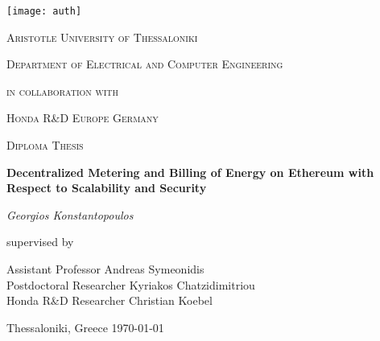 \begin{titlepage}
	\centering
	\texttt{[image: auth]}\par\vspace{1cm}
	{\scshape\LARGE Aristotle University of Thessaloniki \par}
	{\scshape\Large Department of Electrical and Computer Engineering\par}
	\vspace{1cm}
	{\scshape\Large in collaboration with \par}
	{\scshape\LARGE Honda R\&D Europe Germany \par}
	\vspace{1cm}
	{\scshape\Large Diploma Thesis\par}
	\vspace{1.5cm}
    {\huge\bfseries Decentralized Metering and Billing of Energy on Ethereum with Respect to Scalability and Security \par}
	\vspace{2cm}
	{\Large\itshape Georgios Konstantopoulos\par}
	\vfill
	supervised by\par
	Assistant Professor Andreas Symeonidis\\
	Postdoctoral Researcher Kyriakos Chatzidimitriou\\
	Honda R\&D Researcher Christian Koebel 

	\vfill

	{\large Thessaloniki, Greece \today\par}
\end{titlepage}
